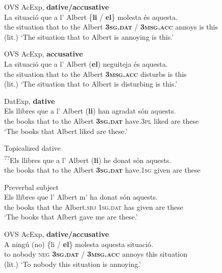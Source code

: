 \documentclass[output=paper,colorlinks,citecolor=brown,modfonts,nonflat]{langsci/langscibook}
\begin{document}
\ea%
 \label{ex:royo:10}
 \ea  OVS AcExp, \textbf{dative/accusative} \label{ex:royo:10a}\\
 \gll  La situació que a l’ Albert \{\textbf{li} / \textbf{el}\} molesta és aquesta.\\
	 the situation that to the Albert \textbf{\textsc{3sg.dat}} / \textbf{\textsc{3msg.acc}} annoys is this\\
 \glt (lit.) ‘The situation that to Albert is annoying is this.’

 \ex OVS AcExp, \textbf{accusative}\label{ex:royo:10b}\\
 \gll La  situació  que a  l’ Albert (\textbf{el}) neguiteja és aquesta.\\
  the situation that to the Albert \textbf{\textsc{3msg.acc}} disturbs is this\\
 \glt (lit.) ‘The situation that to Albert is disturbing is this.’

 \ex  DatExp, \textbf{dative} \label{ex:royo:10c}\\
 \gll Els llibres que a l’ Albert (\textbf{li}) han agradat són aquests.\\
  the books that to the Albert \textbf{\textsc{3sg.dat}} have.\textsc{3pl} liked are these\\
 \glt ‘The books that Albert liked are these.’


 \ex Topicalized dative \label{ex:royo:10d}\\
 \gll \textsuperscript{??}Els llibres que a l’ Albert (\textbf{li}) he donat són aquests.\\
 the books that to the Albert \textbf{\textsc{3sg.dat}} have.\textsc{1sg} given are these\\
 \glt


 \ex  Preverbal subject\label{ex:royo:10e}\\
 \gll  Els llibres que l’ Albert m’ ha donat són aquests.\\
	 the books that the Albert.\textsc{sbj} \textsc{1sg.dat} has given are these\\
 \glt ‘The books that Albert gave me are these.’
 \z
 \z


\ea%
 \label{ex:royo:11}
 \ea OVS AcExp, \textbf{dative/accusative}\label{ex:royo:11a}\\
 \gll  A ningú (no) \{{li} / \textbf{el}\} molesta aquesta situació.\\
    to nobody \textsc{neg} \textbf{\textsc{3sg.dat}} / \textbf{\textsc{3msg.acc}} annoys this situation\\
\glt (lit.) ‘To nobody this situation is annoying.’
\end{document}
